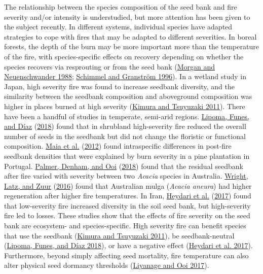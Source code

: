 \documentclass[
  12pt,
]{article}
\begin{document}
The relationship between the species composition of the seed bank and
fire severity and/or intensity is understudied, but more attention has
been given to the subject recently. In different systems, individual
species have adapted strategies to cope with fires that may be adapted
to different severities. In boreal forests, the depth of the burn may be
more important more than the temperature of the fire, with
species-specific effects on recovery depending on whether the species
recovers via resprouting or from the seed bank
(\protect\hyperlink{ref-Morgan1988}{Morgan and Neuenschwander 1988};
\protect\hyperlink{ref-Schimmel1996}{Schimmel and Granström 1996}). In a
wetland study in Japan, high severity fire was found to increase
seedbank diversity, and the similarity between the seedbank composition
and aboveground composition was higher in places burned at high severity
(\protect\hyperlink{ref-Kimura2011}{Kimura and Tsuyuzaki 2011}). There
have been a handful of studies in temperate, semi-arid regions.
\protect\hyperlink{ref-Lipoma2018}{Lipoma, Funes, and Díaz}
(\protect\hyperlink{ref-Lipoma2018}{2018}) found that in shrubland
high-severity fire reduced the overall number of seeds in the seedbank
but did not change the floristic or functional composition.
\protect\hyperlink{ref-Maia2012}{Maia et al.}
(\protect\hyperlink{ref-Maia2012}{2012}) found intraspecific differences
in post-fire seedbank densities that were explained by burn severity in
a pine plantation in Portugal.
\protect\hyperlink{ref-Palmer2018}{Palmer, Denham, and Ooi}
(\protect\hyperlink{ref-Palmer2018}{2018}) found that the residual
seedbank after fire varied with severity between two \emph{Acacia}
species in Australia. \protect\hyperlink{ref-Wright2016}{Wright, Latz,
and Zuur} (\protect\hyperlink{ref-Wright2016}{2016}) found that
Australian mulga (\emph{Acacia aneura}) had higher regeneration after
higher fire temperatures. In Iran,
\protect\hyperlink{ref-Heydari2017}{Heydari et al.}
(\protect\hyperlink{ref-Heydari2017}{2017}) found that low-severity fire
increased diversity in the soil seed bank, but high-severity fire led to
losses. These studies show that the effects of fire severity on the seed
bank are ecosystem- and species-specific. High severity fire can benefit
species that use the seedbank (\protect\hyperlink{ref-Kimura2011}{Kimura
and Tsuyuzaki 2011}), be seedbank-neutral
(\protect\hyperlink{ref-Lipoma2018}{Lipoma, Funes, and Díaz 2018}), or
have a negative effect (\protect\hyperlink{ref-Heydari2017}{Heydari et
al. 2017}). Furthermore, beyond simply affecting seed mortality, fire
temperature can also alter physical seed dormancy thresholds
(\protect\hyperlink{ref-Liyanage2017}{Liyanage and Ooi 2017}).
\end{document}
